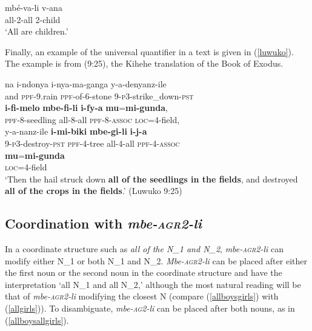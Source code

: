 \documentclass[letterpaper, 12pt]{article}
\begin{document}
\begin{exe}
\ex \label{allarechildren} \gll mb\'e-va-li v-ana \\
all-2-all 2-child \\
`All are children.'
\end{exe}


Finally, an example of the universal quantifier in a text is given in (\ref{luwuko}). The example is from \citeauthor{luwuko} (9:25), the Kihehe translation of the Book of Exodus.

\begin{exe} 
\singlespacing 

\ex\gll na i-ndonya i-nya-ma-ganga y-a-denyanz-ile \\ 
and \textsc{ppf}-9.rain \textsc{ppf}-of-6-stone 9-\textsc{p3}-strike\_down-\textsc{pst}\\

\gll \textbf{i-fi-melo} \textbf{mbe-fi-li} \textbf{i-fy-a} \textbf{mu}=\textbf{mi-gunda}, \\
\textsc{ppf}-8-seedling all-8-all \textsc{ppf}-8-\textsc{assoc} \textsc{loc}=4-field,\\

\gll y-a-nanz-ile \textbf{i-mi-biki} \textbf{mbe-gi-li} \textbf{i-j-a}  \\
9-\textsc{p3}-destroy-\textsc{pst} \textsc{ppf}-4-tree all-4-all \textsc{ppf}-4-\textsc{assoc}  \\

\gll \textbf{mu}=\textbf{mi-gunda} \\ 
\textsc{loc}=4-field \\


`Then the hail struck down \textbf{all of the seedlings in the fields}, and destroyed \textbf{all of the crops in the fields}.' \hfill{(Luwuko 9:25)} \label{luwuko}\\

\end{exe}

\subsection{Coordination with \emph{mbe-\textsc{agr2}-li}}

In a coordinate structure such as \textit{all of the N_{1} and N_{2}}, \emph{mbe-\textsc{agr2}-li}  can modify either N_{1} or both N_{1} and N_{2}.  \emph{Mbe-\textsc{agr2}-li} can be placed after either the first noun or the second noun in the coordinate structure and have the interpretation `all N_{1} and all N_{2},' although the most natural reading will be that of \emph{mbe-\textsc{agr2}-li} modifying the closest N (compare (\ref{allboysgirls}) with (\ref{allgirls})). To disambiguate, \emph{mbe-\textsc{ag2}-li} can be placed after both nouns, as in (\ref{allboysallgirls}).
\end{document}
